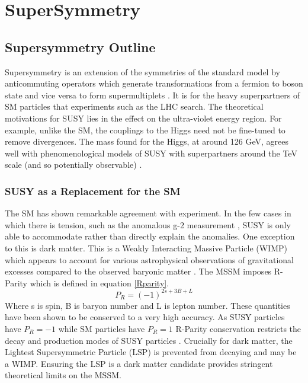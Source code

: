 
\chapter{SuperSymmetry} %

\label{Chapter3} %



\section{Supersymmetry Outline}

Supersymmetry is an extension of the symmetries of the standard model by anticommuting operators which generate transformations from a fermion to boson state and vice versa to form supermultiplets \cite{susyintro}. It is for the heavy superpartners of SM particles that experiments such as the LHC search. The theoretical motivations for SUSY lies in the effect on the ultra-violet energy region. For example, unlike the SM, the couplings to the Higgs need not be fine-tuned to remove divergences. The mass found for the Higgs, at around 126 GeV, agrees well with phenomenological models of SUSY with superpartners around the TeV scale (and so potentially observable) \cite{susyhiggs}. 
\subsection{SUSY as a Replacement for the SM}
The SM has shown remarkable agreement with experiment. In the few cases in which there is tension, such as the anomalous g-2 measurement \cite{gm2}, SUSY is only able to accommodate rather than directly explain the anomalies. One exception to this is dark matter. This is a Weakly Interacting Massive Particle (WIMP) which appears to account for various astrophysical observations of gravitational excesses compared to the observed baryonic matter \cite{dm}. The MSSM imposes R-Parity which is defined in equation \ref{Rparity}. 
\begin{equation}
\label{Rparity}
P_R=(-1)^{2s+3B+L}
\end{equation}
Where s is spin, B is baryon number and L is lepton number. These quantities have been shown to be conserved to a very high accuracy. As SUSY particles have $P_R=-1$ while SM particles have $P_R=1$ R-Parity conservation restricts the decay and production modes of SUSY particles \cite{susywimp}. Crucially for dark matter, the Lightest Supersymmetric Particle (LSP) is prevented from decaying and may be a WIMP. Ensuring the LSP is a dark matter candidate provides stringent theoretical limits on the MSSM.

